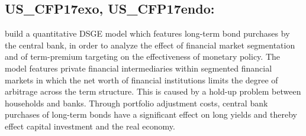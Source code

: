 \documentclass[11pt,a4paper]{article}
\begin{document}
	\subsection{US\_CFP17exo, US\_CFP17endo: \cite{carlstrom2017targeting}}
	\label{USCFP17}
	\cite{carlstrom2017targeting} build a quantitative DSGE model which features long-term bond purchases by the central bank, in order to analyze the effect of financial market segmentation and of term-premium targeting on the effectiveness of monetary policy. The model features private financial intermediaries within segmented financial markets in which the net worth of financial institutions limits the degree of arbitrage across the term structure. This is caused by a hold-up problem between households and banks. Through portfolio adjustment costs, central bank purchases of long-term bonds have a significant effect on long yields and thereby effect capital investment and the real economy. 
\end{document}
